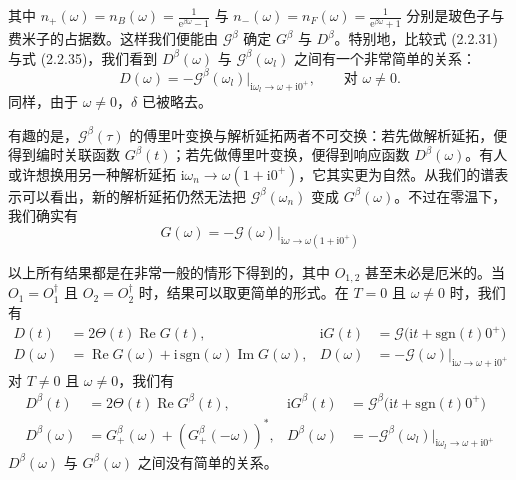 其中 $n_{+}(\omega) = n_B(\omega) = \frac{1}{\mathrm{e}^{\beta\omega} - 1}$ 与 $n_{-}(\omega) = n_F(\omega) = \frac{1}{\mathrm{e}^{\beta\omega} + 1}$ 分别是玻色子与费米子的占据数。这样我们便能由 $\mathcal{G}^{\beta}$ 确定 $G^{\beta}$ 与 $D^{\beta}$。特别地，比较式 (2.2.31) 与式 (2.2.35)，我们看到 $D^{\beta}(\omega)$ 与 $\mathcal{G}^{\beta}(\omega_l)$ 之间有一个非常简单的关系：
\begin{equation*}
\boxed{\; D(\omega) = -\mathcal{G}^{\beta}(\omega_l)\bigr|_{\mathrm{i}\omega_l \to \omega + \mathrm{i}0^{+}}, \qquad \text{对 } \omega \neq 0. \;} \tag{2.2.38}
\end{equation*}
同样，由于 $\omega \neq 0$，$\delta$ 已被略去。

有趣的是，$\mathcal{G}^{\beta}(\tau)$ 的傅里叶变换与解析延拓两者不可交换：若先做解析延拓，便得到编时关联函数 $G^{\beta}(t)$；若先做傅里叶变换，便得到响应函数 $D^{\beta}(\omega)$。有人或许想换用另一种解析延拓 $\mathrm{i}\omega_n \to \omega(1 + \mathrm{i}0^{+})$，它其实更为自然。从我们的谱表示可以看出，新的解析延拓仍然无法把 $\mathcal{G}^{\beta}(\omega_n)$ 变成 $G^{\beta}(\omega)$。不过在零温下，我们确实有
\begin{equation*}
\boxed{\; G(\omega) = -\mathcal{G}(\omega)\bigr|_{\mathrm{i}\omega \to \omega(1 + \mathrm{i}0^{+})} \;} \tag{2.2.39}
\end{equation*}

以上所有结果都是在非常一般的情形下得到的，其中 $O_{1,2}$ 甚至未必是厄米的。当 $O_1 = O^{\dagger}_1$ 且 $O_2 = O^{\dagger}_2$ 时，结果可以取更简单的形式。在 $T = 0$ 且 $\omega \neq 0$ 时，我们有
\begin{equation*}
\boxed{
\begin{aligned}
D(t) &= 2\Theta(t)\operatorname{Re} G(t), & \mathrm{i}G(t) &= \mathcal{G}\bigl(\mathrm{i}t + \mathrm{sgn}(t)0^{+}\bigr)
\\
D(\omega) &= \operatorname{Re} G(\omega) + \mathrm{i}\,\mathrm{sgn}(\omega)\operatorname{Im} G(\omega), & D(\omega) &= -\mathcal{G}(\omega)\bigr|_{\mathrm{i}\omega \to \omega + \mathrm{i}0^{+}}
\end{aligned}
} \tag{2.2.40}
\end{equation*}
对 $T \neq 0$ 且 $\omega \neq 0$，我们有
\begin{equation*}
\boxed{
\begin{aligned}
D^{\beta}(t) &= 2\Theta(t)\operatorname{Re} G^{\beta}(t), & \mathrm{i}G^{\beta}(t) &= \mathcal{G}^{\beta}\bigl(\mathrm{i}t + \mathrm{sgn}(t)0^{+}\bigr)
\\
D^{\beta}(\omega) &= G^{\beta}_{+}(\omega) + \left( G^{\beta}_{+}(-\omega) \right)^{*}, & D^{\beta}(\omega) &= -\mathcal{G}^{\beta}(\omega_l)\bigr|_{\mathrm{i}\omega_l \to \omega + \mathrm{i}0^{+}}
\end{aligned}
} \tag{2.2.41}
\end{equation*}
$D^{\beta}(\omega)$ 与 $G^{\beta}(\omega)$ 之间没有简单的关系。

